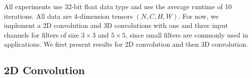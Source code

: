 All experiments use 32-bit float data type and use the average runtime of 10 iterations. All data are 4-dimension tensors $(N,C,H,W)$. For
now, we implement a 2D convolution and 3D convolutions with one and three input channels for filters of size $3 \times 3$ and $5 \times 5$,
since small filters are commonly used in applications. We first present results for 2D convolution and then 3D convolution.

\subsection{2D Convolution}
